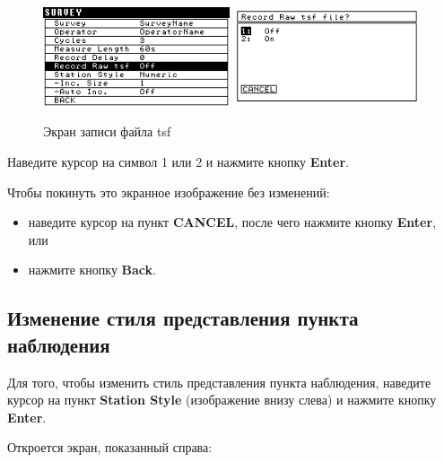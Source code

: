 \begin{figure}[H]
  \centering
  \includegraphics[width=0.49\textwidth]{figures/the_tsf_recording_screen_1}
  \includegraphics[width=0.49\textwidth]{figures/the_tsf_recording_screen_2}
  \caption{Экран записи файла tsf}
  \label{fig:the_tsf_recording_screen}
\end{figure}

Наведите курсор на символ 1 или 2 и нажмите кнопку \textbf{Enter}.

Чтобы покинуть это экранное изображение без изменений:
\begin{itemize}
  \item наведите курсор на пункт \textbf{CANCEL}, после чего нажмите кнопку
    \textbf{Enter}, или

  \item нажмите кнопку \textbf{Back}.
\end{itemize}

\subsection{Изменение стиля представления пункта наблюдения}

Для того, чтобы изменить стиль представления пункта наблюдения, наведите курсор
на пункт \textbf{Station Style} (изображение внизу слева) и нажмите кнопку
\textbf{Enter}.

Откроется экран, показанный справа:

